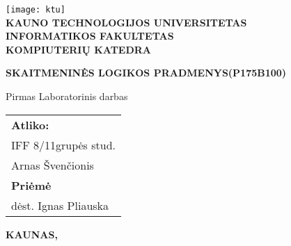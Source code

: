 \begin{titlepage}

\newcommand{\universitetas}{Kauno technologijos universitetas}
\newcommand{\fakultetas}{Informatikos fakultetas}
\newcommand{\katedra}{Kompiuterių katedra}
\newcommand{\pavadinimas}{Skaitmeninės Logikos Pradmenys(P175B100)}
\newcommand{\tipas}{Pirmas Laboratorinis darbas}
\newcommand{\grupe}{IFF 8/11}
\newcommand{\atliko}{Arnas Švenčionis}
\newcommand{\prieme}{dėst. Ignas Pliauska}
\newcommand{\miestas}{Kaunas}
\newcommand{\metai}{\the\year}

\renewcommand{\headrulewidth}{0pt}

    \onehalfspacing
	\center
	\texttt{[image: ktu]} \\
    \LARGE\textbf{\MakeUppercase{\universitetas}} \\ [5mm]
    \Large\textbf{\MakeUppercase{\fakultetas}} \\ [5mm]	
    \large\textbf{\MakeUppercase{\katedra}} \vfill
	{\fontsize{22}{26}\centering\bfseries\MakeUppercase{\pavadinimas}\par} \vfill
    {\centering \Large \tipas} \vfill
    
	\flushright	
	{\center	
		\normalsize
		\begin{tabular}{l}\onehalfspacing	
			\textbf{Atliko:} \\[1.5pt]
			\grupe grupės stud. \\
			\atliko \\[1cm]

			\textbf{Priėmė}\\[1.5pt]
			\prieme
		\end{tabular}
	}
	\vfill
	\center
	\normalsize\textbf{\MakeUppercase{\miestas}, \metai}
\end{titlepage}
